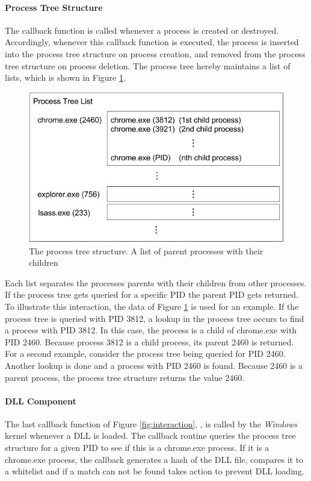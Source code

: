 \paragraph{Process Tree Structure}
The  callback function is called whenever a process is created or destroyed. Accordingly, whenever this callback function is executed, the process is inserted into the process tree structure on process creation, and removed from the process tree structure on process deletion. The process tree hereby maintains a list of lists, which is shown in Figure \ref{fig:listoflists}.
\begin{figure}[!htbp]
\centering
\includegraphics[scale=0.6]{sections/implementation/listoflists.png}
\caption{The process tree structure. A list of parent processes with their children}
\label{fig:listoflists}
\end{figure}
Each list separates the processes parents with their children from other processes. If the process tree gets queried for a specific \gls{PID} the parent \gls{PID} gets returned. To illustrate this interaction, the data of Figure \ref{fig:listoflists} is used for an example. If the process tree is queried with \gls{PID} 3812, a lookup in the process tree occurs to find a process with \gls{PID} 3812. In this case, the process is a child of chrome.exe with \gls{PID} 2460.
Because process 3812 is a child process, its parent 2460 is returned. For a second example, consider the process tree being queried for \gls{PID} 2460. Another lookup is done and a process with \gls{PID} 2460 is found. Because 2460 is a parent process, the process tree structure returns the value 2460.

\paragraph{DLL Component}
The last callback function of Figure \ref{fig:interaction}, , is called by the \emph{Windows} kernel whenever a DLL is loaded. The callback routine queries the process tree structure for a given \gls{PID} to see if this is a chrome.exe process. If it is a chrome.exe process, the callback generates a hash of the DLL file, compares it to a whitelist and if a match can not be found takes action to prevent DLL loading.